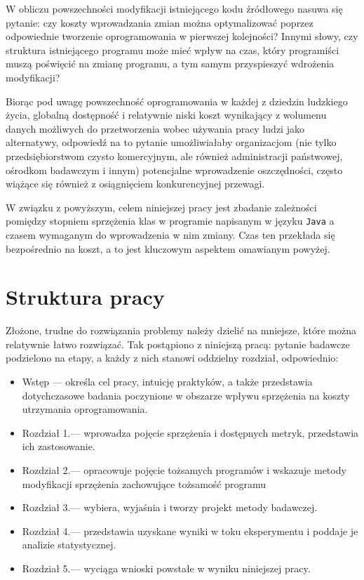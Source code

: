 W obliczu powszechności modyfikacji istniejącego kodu źródłowego nasuwa się
pytanie: czy koszty wprowadzania zmian można optymalizować poprzez odpowiednie
tworzenie oprogramowania w pierwszej kolejności?
Innymi słowy, czy struktura istniejącego programu może mieć wpływ na czas,
który programiści muszą poświęcić na zmianę programu, a tym samym przyspieszyć
wdrożenia modyfikacji?

Biorąc pod uwagę powszechność oprogramowania w każdej z dziedzin ludzkiego
życia, globalną dostępność i relatywnie niski koszt wynikający z wolumenu
danych możliwych do przetworzenia wobec używania pracy ludzi jako alternatywy,
odpowiedź na to pytanie umożliwiałaby organizacjom (nie tylko
przedsiębiorstwom czysto komercyjnym, ale również administracji państwowej,
ośrodkom badawczym i innym) potencjalne wprowadzenie oszczędności, często
wiążące się również z osiągnięciem konkurencyjnej przewagi.

W związku z powyższym, celem niniejszej pracy jest zbadanie zależności pomiędzy
stopniem sprzężenia klas w programie napisanym w języku \texttt{Java}
a czasem wymaganym do wprowadzenia w nim zmiany.
Czas ten przekłada się bezpośrednio na koszt, a to jest kluczowym
aspektem omawianym powyżej.

\section{Struktura pracy}

Złożone, trudne do rozwiązania problemy należy dzielić na mniejsze, które
można relatywnie łatwo rozwiązać.
Tak postąpiono z niniejszą pracą: pytanie badawcze podzielono na etapy, a każdy
z nich stanowi oddzielny rozdział, odpowiednio:

\begin{itemize}
    \item Wstęp --- określa cel pracy, intuicję praktyków, a także przedstawia dotychczasowe badania poczynione w
    obszarze wpływu sprzężenia na koszty utrzymania oprogramowania.
    \item Rozdział 1.\@ --- wprowadza pojęcie sprzężenia i dostępnych metryk, przedstawia ich zastosowanie.
    \item Rozdział 2.\@ --- opracowuje pojęcie tożsamych programów i wskazuje metody modyfikacji sprzężenia
    zachowujące tożsamość programu
    \item Rozdział 3.\@ --- wybiera, wyjaśnia i tworzy projekt metody badawczej.
    \item Rozdział 4.\@ --- przedstawia uzyskane wyniki w toku eksperymentu i poddaje je analizie statystycznej.
    \item Rozdział 5.\@ --- wyciąga wnioski powstałe w wyniku niniejszej pracy.
\end{itemize}

